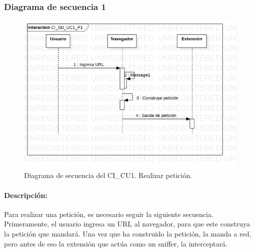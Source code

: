 \documentclass[12pt, a4paper, titlepage]{report}
\begin{document}
              	\subsubsection{Diagrama de secuencia 1}
                	\begin{figure}[H]
        			    \begin{center} \includegraphics[width=15cm]{./imagenes/Disenio/Componente_1/CI_SD_UC1_P1.png}
        			    \caption[Diagrama de secuencia 1 del Componente I]{Diagrama de secuencia del CI\_CU1. Realizar petición.}
        		        \end{center}
        		    \end{figure}
        		    
        		    \paragraph{Descripción:}
        		    Para realizar una petición, es necesario seguir la siguiente secuencia. Primeramente, el usuario ingresa un URL al navegador, para que este construya la petición que mandará. Una vez que ha construido la petición, la manda a red, pero antes de eso la extensión que actúa como un sniffer, la interceptará.
    		    
    		    
\end{document}
